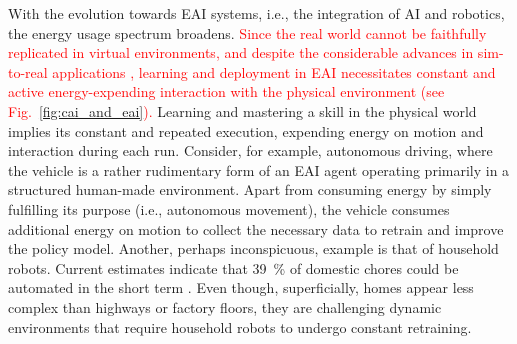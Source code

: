 \documentclass[12pt]{article}
\newcommand\myhl[1]{\textcolor{red}{#1}}
\begin{document}
With the evolution towards EAI systems, i.e., the integration of AI and robotics, the energy usage spectrum broadens. \myhl{Since the real world cannot be faithfully replicated in virtual environments, and despite the considerable advances in sim-to-real applications \cite{Chebotar2019Closingsimreal}, learning and deployment in EAI necessitates constant and active energy-expending interaction with the physical environment (see Fig.~\ref{fig:cai_and_eai}).} Learning and mastering a skill in the physical world implies its constant and repeated execution, expending energy on motion and interaction during each run. Consider, for example, autonomous driving, where the vehicle is a rather rudimentary form of an EAI agent operating primarily in a structured human-made environment. Apart from consuming energy by simply fulfilling its purpose (i.e., autonomous movement), the vehicle consumes additional energy on motion to collect the necessary data to retrain and improve the policy model. Another, perhaps inconspicuous, example is that of household robots. Current estimates indicate that 39~\%  of domestic chores could be automated in the short term \cite{Lehdonvirta2022futuresunpaidwork}. Even though, superficially, homes appear less complex than highways or factory floors, they are challenging dynamic environments that require household robots to undergo constant retraining. 
\end{document}
